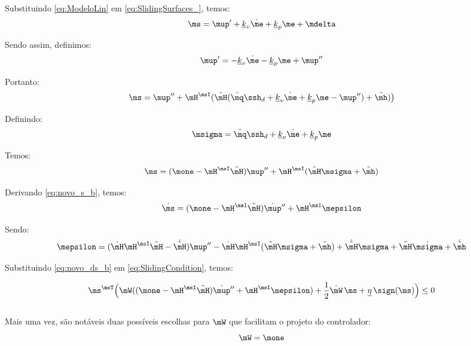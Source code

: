 \documentclass[]{politex}
\begin{document}
\begin{itemize}
Substituindo \eqref{eq:ModeloLin} em \eqref{eq:SlidingSurfaces_}, temos:
\begin{equation}
\ms = \mup' + \underline{k}_v \dot{\me} + \underline{k}_p \me + \mdelta
\end{equation}

Sendo assim, definimos:
\begin{equation}
\mup' = -\underline{k}_v \dot{\me} - \underline{k}_p \me + \mup''
\end{equation}

Portanto:
\begin{equation}
\ms = \mup'' + \mH^\msI( \tilde{\mH}(\ddot{\mq}\ssh_d + \underline{k}_v \dot{\me} + \underline{k}_p \me - \mup'') + \tilde{\mh} ) \big)
\end{equation}

Definindo:
\begin{equation}
\msigma = \ddot{\mq}\ssh_d + \underline{k}_v \dot{\me} + \underline{k}_p \me
\end{equation}

Temos:
\begin{equation} \label{eq:novo_s_b}
\ms = (\mone - \mH^\msI \tilde{\mH} )\mup'' + \mH^\msI( \tilde{\mH}\msigma + \tilde{\mh} )
\end{equation}

Derivando \eqref{eq:novo_s_b}, temos:
\begin{equation} \label{eq:novo_ds_b}
\dot{\ms} = (\mone - \mH^\msI \tilde{\mH} )\dot{\mup}'' + \mH^\msI \mepsilon
\end{equation}

Sendo:
\begin{equation}
\mepsilon = ( \dot{\mH} \mH^\msI \tilde{\mH} -\dot{\tilde{\mH}}) \mup'' -  \dot{\mH} \mH^\msI ( \tilde{\mH}\msigma + \tilde{\mh} ) +  \dot{\tilde{\mH}}\msigma + \tilde{\mH} \dot{\msigma} + \dot{\tilde{\mh}}
\end{equation}


Substituindo \eqref{eq:novo_ds_b} em \eqref{eq:SlidingCondition}, temos:

\begin{equation} \label{eq:SlidingCondition2b}
\ms^\msT \Big(\mW ( (\mone - \mH^\msI \tilde{\mH} )\dot{\mup}'' + \mH^\msI \mepsilon ) + \frac{1}{2}\dot{\mW} \, \ms + \underline{\eta} \, \sign(\ms) \Big) \leq 0
\end{equation} \\


Mais uma vez, são notáveis duas possíveis escolhas para $\mW$ que facilitam o projeto do controlador:
\begin{equation} \label{eq:W1b}
\mW = \mone
\end{equation}


\end{itemize}
\end{document}
